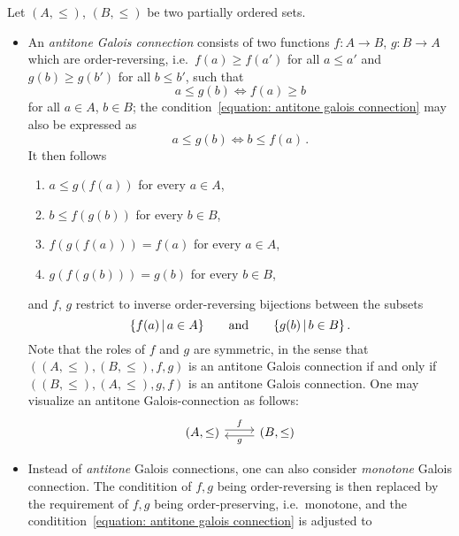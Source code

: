 \begin{remark}
  Let $(A,\leq)$, $(B, \leq)$ be two partially ordered sets.
  \begin{itemize}
    \item
      An \emph{antitone Galois connection} consists of two functions $f \colon A \to B$, $g \colon B \to A$ which are order-reversing, i.e.\ $f(a) \geq f(a')$ for all $a \leq a'$ and $g(b) \geq g(b')$ for all $b \leq b'$, such that
      \begin{equation}
        \label{equation: antitone galois connection}
              a \leq g(b)
        \iff  f(a) \geq b
      \end{equation}
      for all $a \in A$, $b \in B$;
      the condition~\eqref{equation: antitone galois connection} may also be expressed as
      \[
              a \leq g(b)
        \iff  b \leq f(a) \,.
      \]
      It then follows
      \begin{enumerate}
        \item
          $a \leq g(f(a))$ for every $a \in A$,
        \item
          $b \leq f(g(b))$ for every $b \in B$,
        \item
          $f(g(f(a))) = f(a)$ for every $a \in A$,
        \item
          $g(f(g(b))) = g(b)$ for every $b \in B$,
      \end{enumerate}
      and $f$, $g$ restrict to inverse order-reversing bijections between the subsets
      \[
        \{ f(a) \suchthat a \in A \}
        \qquad\text{and}\qquad
        \{ g(b) \suchthat b \in B \} \,.
      \]
      Note that the roles of $f$ and $g$ are symmetric, in the sense that $((A, \leq), (B, \leq), f, g)$ is an antitone Galois connection if and only if $((B, \leq), (A, \leq), g, f)$ is an antitone Galois connection.
      One may visualize an antitone Galois-connection as follows:
      \[
        \begin{tikzcd}
            (A,\leq)
            \arrow[shift left]{r}[above]{f}
          & (B,\leq)
            \arrow[shift left]{l}[below]{g}
        \end{tikzcd}
      \]
    \item
      Instead of \emph{antitone} Galois connections, one can also consider \emph{monotone} Galois connection.
      The conditition of $f, g$ being order-reversing is then replaced by the requirement of $f, g$ being order-preserving, i.e.\ monotone, and the conditition~\eqref{equation: antitone galois connection} is adjusted to

\end{itemize}
\end{remark}
